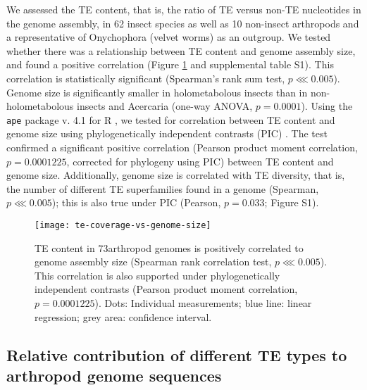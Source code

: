 We assessed the TE content, that is, the ratio of TE versus non-TE
nucleotides in the genome assembly, in 62 insect species as well as 10
non-insect arthropods and a representative of Onychophora (velvet worms)
as an outgroup. We tested whether there was a relationship between TE
content and genome assembly size, and found a positive correlation (Figure
\ref{fig:te-coverage-vs-size} and supplemental table S1). This
correlation is statistically significant (Spearman's rank sum test, \(p
\lll 0.005\)). Genome size is significantly smaller in holometabolous
insects than in non-holometabolous insects and Acercaria (one-way ANOVA,
\(p = 0.0001\)). Using the \texttt{ape} package v. 4.1
\citep{Paradis2004} for R \citep{RCoreTeam2017}, we tested for
correlation between TE content and genome size using phylogenetically
independent contrasts (PIC) \citep{Felsenstein1985}. The test confirmed
a significant positive correlation (Pearson product moment correlation,
\(p = 0.0001225\), corrected for phylogeny using PIC) between TE content
and genome size.  Additionally, genome size is correlated with TE
diversity, that is, the number of different TE superfamilies found in a
genome (Spearman, \(p \lll 0.005\)); this is also true under PIC
(Pearson, \(p = 0.033\); Figure S1).

\begin{figure}[t]
\begin{center}
\texttt{[image: te-coverage-vs-genome-size]}
\caption[TE content is positively correlated to genome size]{{TE content
in 73arthropod genomes is positively correlated to genome assembly size
(Spearman rank correlation test, \(p \lll 0.005\)). This correlation is
also supported under phylogenetically independent contrasts
\protect\citep{Felsenstein1985} (Pearson product moment correlation, \(p
= 0.0001225\)). Dots: Individual measurements; blue line: linear
regression; grey area: confidence interval.%
}}
\label{fig:te-coverage-vs-size}
\end{center}
\end{figure}

\subsection{Relative contribution of different TE types to arthropod
genome
sequences}\label{relative-contribution-of-different-te-types-to-arthropod-genome-sequences}

